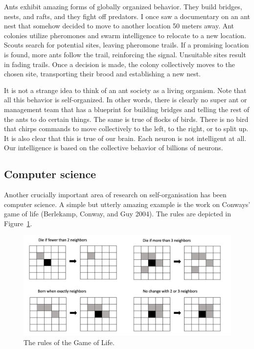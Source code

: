 \documentclass[
  a4paper,
  DIV=11,
  numbers=noendperiod,
  oneside]{scrreprt}
\begin{document}
Ants exhibit amazing forms of globally organized behavior. They build
bridges, nests, and rafts, and they fight off predators. I once saw a
documentary on an ant nest that somehow decided to move to another
location 50 meters away. Ant colonies utilize pheromones and swarm
intelligence to relocate to a new location. Scouts search for potential
sites, leaving pheromone trails. If a promising location is found, more
ants follow the trail, reinforcing the signal. Unsuitable sites result
in fading trails. Once a decision is made, the colony collectively moves
to the chosen site, transporting their brood and establishing a new
nest.

It is not a strange idea to think of an ant society as a living
organism. Note that all this behavior is self-organized. In other words,
there is clearly no super ant or management team that has a blueprint
for building bridges and telling the rest of the ants to do certain
things. The same is true of flocks of birds. There is no bird that
chirps commands to move collectively to the left, to the right, or to
split up. It is also clear that this is true of our brain. Each neuron
is not intelligent at all. Our intelligence is based on the collective
behavior of billions of neurons.

\hypertarget{sec-Computer-science}{%
\subsection{Computer science}\label{sec-Computer-science}}

Another crucially important area of research on self-organisation has
been computer science. A simple but utterly amazing example is the work
on Conways' game of life (Berlekamp, Conway, and Guy 2004). The rules
are depicted in Figure~\ref{fig-ch5n-img3-old-41}.

\begin{figure}

{\centering \includegraphics{media/ch5n/image3.jpg}

}

\caption{\label{fig-ch5n-img3-old-41}The rules of the Game of Life.}

\end{figure}
\end{document}
